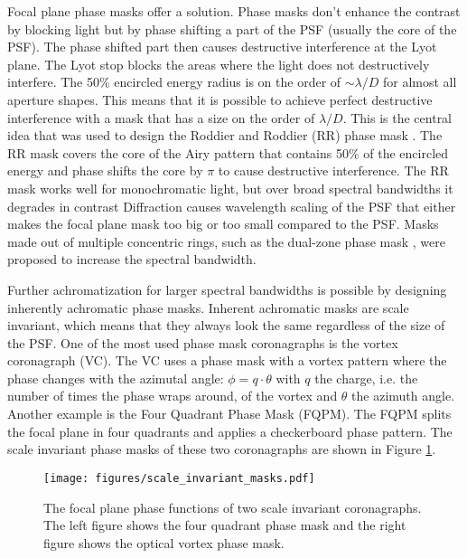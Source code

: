 \documentclass[letterpaper]{ar-1col}
\begin{document}
Focal plane phase masks offer a solution.
%
Phase masks don't enhance the contrast by blocking light but by phase shifting a part of the PSF (usually the core of the PSF).
%
The phase shifted part then causes destructive interference at the Lyot plane.
%
The Lyot stop blocks the areas where the light does not destructively interfere.
%
The 50\% encircled energy radius is on the order of $\sim \lambda/D$ for almost all aperture shapes.
%
This means that it is possible to achieve perfect destructive interference with a mask that has a size on the order of $\lambda/D$.
%
This is the central idea that was used to design the Roddier and Roddier (RR) phase mask \cite{roddier1997stellar}.
%
The RR mask covers the core of the Airy pattern that contains 50\% of the encircled energy and phase shifts the core by $\pi$ to cause destructive interference.
%
The RR mask works well for monochromatic light, but over broad spectral bandwidths it degrades in contrast
%
Diffraction causes wavelength scaling of the PSF that either makes the focal plane mask too big or too small compared to the PSF.
%
Masks made out of multiple concentric rings, such as the dual-zone phase mask \citep{soummer2003achromatic}, were proposed to increase the spectral bandwidth.

Further achromatization for larger spectral bandwidths is possible by designing inherently achromatic phase masks.
%
Inherent achromatic masks are scale invariant, which means that they always look the same regardless of the size of the PSF.
%
One of the most used phase mask coronagraphs is the vortex coronagraph (VC).
%
The VC uses a phase mask with a vortex pattern where the phase changes with the azimutal angle: $\phi=q \cdot \theta$ with $q$ the charge, i.e. the number of times the phase wraps around, of the vortex and $\theta$ the azimuth angle.
%
Another example is the Four Quadrant Phase Mask (FQPM).
%
The FQPM splits the focal plane in four quadrants and applies a checkerboard phase pattern.
%
The scale invariant phase masks of these two coronagraphs are shown in Figure \ref{fig:scale_invariant}.

\begin{figure}[ht]
  \centering
  \texttt{[image: figures/scale\_invariant\_masks.pdf]}
  \caption{The focal plane phase functions of two scale invariant coronagraphs.
  The left figure shows the four quadrant phase mask and the right figure shows the optical vortex phase mask.}
  \label{fig:scale_invariant}
\end{figure}
\end{document}
